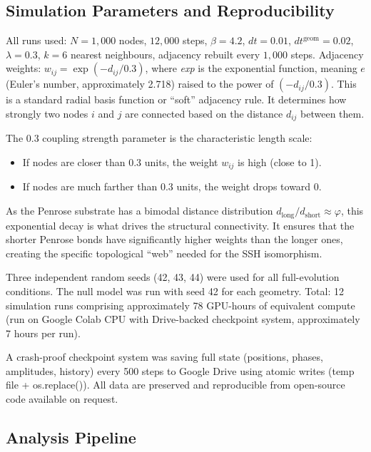 \documentclass[11pt,a4paper]{article}
\begin{document}
\subsection{Simulation Parameters and Reproducibility}

All runs used: $N = 1{,}000$ nodes, $12{,}000$ steps, $\beta = 4.2$, $dt = 0.01$, $dt^{\text{geom}} = 0.02$, $\lambda = 0.3$, $k = 6$ nearest neighbours, adjacency rebuilt every $1{,}000$ steps. Adjacency weights: $w_{ij} = \exp(-d_{ij}/0.3)$, where \textit{exp} is the exponential function, meaning $e$ (Euler's number, approximately 2.718) raised to the power of $(-d_{ij}/0.3)$. This is a standard radial basis function or ``soft'' adjacency rule. It determines how strongly two nodes $i$ and $j$ are connected based on the distance $d_{ij}$ between them.

The 0.3 coupling strength parameter is the characteristic length scale:

\begin{itemize}
\item If nodes are closer than 0.3 units, the weight $w_{ij}$ is high (close to 1).
\item If nodes are much farther than 0.3 units, the weight drops toward 0.
\end{itemize}

As the Penrose substrate has a bimodal distance distribution $d_{\text{long}}/d_{\text{short}} \approx \varphi$, this exponential decay is what drives the structural connectivity. It ensures that the shorter Penrose bonds have significantly higher weights than the longer ones, creating the specific topological ``web'' needed for the SSH isomorphism.

Three independent random seeds (42, 43, 44) were used for all full-evolution conditions. The null model was run with seed 42 for each geometry. Total: 12 simulation runs comprising approximately 78 GPU-hours of equivalent compute (run on Google Colab CPU with Drive-backed checkpoint system, approximately 7 hours per run).

A crash-proof checkpoint system was saving full state (positions, phases, amplitudes, history) every 500 steps to Google Drive using atomic writes (temp file + os.replace()). All data are preserved and reproducible from open-source code available on request.

\subsection{Analysis Pipeline}
\end{document}
